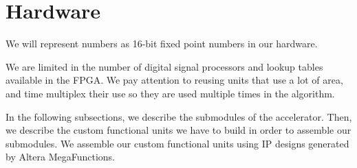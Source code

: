 \section{Hardware}

We will represent numbers as 16-bit fixed point numbers in our hardware.

We are limited in the number of digital signal processors and lookup tables available in the FPGA. We pay attention to reusing units that use a lot of area, and time multiplex their use so they are used multiple times in the algorithm.

In the following subsections, we describe the submodules of the accelerator. Then, we describe the custom functional units we have to build in order to assemble our submodules. We assemble our custom functional units using IP designs generated by Altera MegaFunctions.





